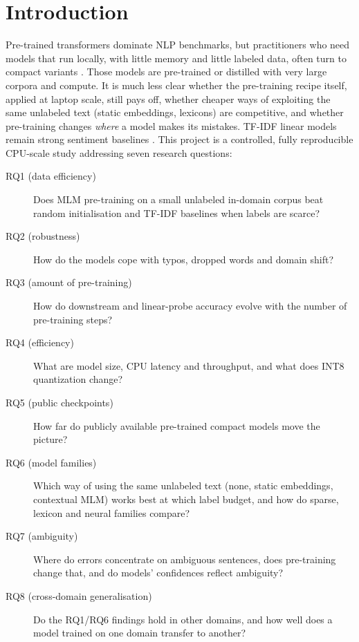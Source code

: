 \documentclass[11pt,a4paper]{article}
\begin{document}
\section{Introduction}
Pre-trained transformers \cite{devlin2019bert} dominate NLP benchmarks, but practitioners who need models that run locally, with little memory and little labeled data, often turn to compact variants
\cite{turc2019well,sanh2019distilbert,jiao2020tinybert,wang2020minilm}. Those models are pre-trained or distilled with very large corpora and compute. It is much less clear whether the pre-training recipe itself,
applied at laptop scale, still pays off, whether cheaper ways of exploiting the same unlabeled text (static embeddings, lexicons) are competitive, and whether pre-training changes \emph{where} a model makes its mistakes.
TF-IDF linear models remain strong sentiment baselines \cite{wang2012baselines}. This project is a controlled, fully reproducible CPU-scale study addressing seven research questions:

\begin{description}
\item[RQ1 (data efficiency)] Does MLM pre-training on a small unlabeled in-domain corpus beat random initialisation and TF-IDF baselines when labels are scarce?
\item[RQ2 (robustness)] How do the models cope with typos, dropped words and domain shift?
\item[RQ3 (amount of pre-training)] How do downstream and linear-probe accuracy evolve with the number of pre-training steps?
\item[RQ4 (efficiency)] What are model size, CPU latency and throughput, and what does INT8 quantization change?
\item[RQ5 (public checkpoints)] How far do publicly available pre-trained compact models move the picture?
\item[RQ6 (model families)] Which way of using the same unlabeled text (none, static embeddings, contextual MLM) works best at which label budget, and how do sparse, lexicon and neural families compare?
\item[RQ7 (ambiguity)] Where do errors concentrate on ambiguous sentences, does pre-training change that, and do models' confidences reflect ambiguity?
\item[RQ8 (cross-domain generalisation)] Do the RQ1/RQ6 findings hold in other domains, and how well does a model trained on one domain transfer to another?
\end{description}
\end{document}
